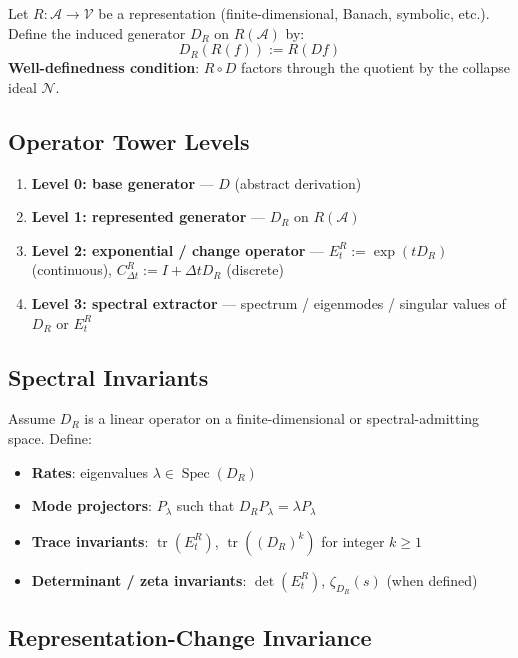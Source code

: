 \documentclass[12pt, oneside]{article}
\DeclareMathOperator{\tr}{tr}
\DeclareMathOperator{\Spec}{Spec}
\newcommand{\N}{\mathcal{N}}
\begin{document}
Let $R: \mathcal{A} \rightarrow \mathcal{V}$ be a representation (finite-dimensional, Banach, symbolic, etc.). Define the induced generator $D_R$ on $R(\mathcal{A})$ by:
\begin{equation}
D_R(R(f)) := R(Df)
\end{equation}
\textbf{Well-definedness condition}: $R \circ D$ factors through the quotient by the collapse ideal $\N$.

\subsection{Operator Tower Levels}

\begin{enumerate}
    \item \textbf{Level 0: base generator} — $D$ (abstract derivation)
    \item \textbf{Level 1: represented generator} — $D_R$ on $R(\mathcal{A})$
    \item \textbf{Level 2: exponential / change operator} — $E_t^R := \exp(tD_R)$ (continuous), $C_{\Delta t}^R := I + \Delta t D_R$ (discrete)
    \item \textbf{Level 3: spectral extractor} — spectrum / eigenmodes / singular values of $D_R$ or $E_t^R$
\end{enumerate}

\subsection{Spectral Invariants}

Assume $D_R$ is a linear operator on a finite-dimensional or spectral-admitting space. Define:
\begin{itemize}
    \item \textbf{Rates}: eigenvalues $\lambda \in \Spec(D_R)$
    \item \textbf{Mode projectors}: $P_\lambda$ such that $D_R P_\lambda = \lambda P_\lambda$
    \item \textbf{Trace invariants}: $\tr(E_t^R)$, $\tr((D_R)^k)$ for integer $k \geq 1$
    \item \textbf{Determinant / zeta invariants}: $\det(E_t^R)$, $\zeta_{D_R}(s)$ (when defined)
\end{itemize}

\subsection{Representation-Change Invariance}
\end{document}
